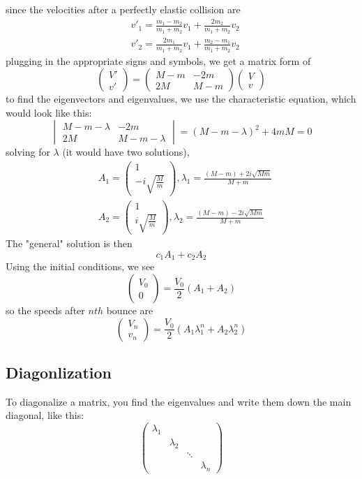 \documentclass[oneside]{book}
\numberwithin{equation}{chapter} %
\begin{document}
since the velocities after a perfectly elastic collision are
\begin{align*}
	&v'_1=\frac{m_1-m_2}{m_1+m_2}v_1+\frac{2m_2}{m_1+m_2}v_2\\
	&v'_2=\frac{2m_1}{m_1+m_2}v_1+\frac{m_2-m_1}{m_1+m_2}v_2
\end{align*}
plugging in the appropriate signs and symbols, we get a matrix form of 
$$
\begin{pmatrix}
	V'\\v'
\end{pmatrix}
=
\begin{pmatrix}
	M-m&-2m\\2M&M-m
\end{pmatrix}
\begin{pmatrix}
	V\\v
\end{pmatrix}
$$
to find the eigenvectors and eigenvalues, we use the characteristic equation, which would look like this:
$$
\begin{vmatrix}
	M-m-\lambda&-2m\\2M&M-m-\lambda
\end{vmatrix}
=(M-m-\lambda)^2+4mM=0
$$
solving for $\lambda$ (it would have two solutions), 
\begin{align*}
	&A_1=\begin{pmatrix}
		1\\-i\sqrt{\frac{M}{m}}
	\end{pmatrix}, \lambda_1=\frac{(M-m)+2i\sqrt{Mm}}{M+m}\\
	&A_2=\begin{pmatrix}
		1\\i\sqrt{\frac{M}{m}}
	\end{pmatrix}, \lambda_2=\frac{(M-m)-2i\sqrt{Mm}}{M+m}
\end{align*}
The "general" solution is then
$$c_1A_1+c_2A_2$$
Using the initial conditions, we see
$$
\begin{pmatrix}
	V_0\\0
\end{pmatrix}=
\frac{V_0}{2}(A_1+A_2)
$$
so the speeds after $nth$ bounce are 
$$
\begin{pmatrix}
	V_n\\v_n
\end{pmatrix}
=\frac{V_0}{2}(A_1\lambda_1^n+A_2\lambda_2^n)
$$
\subsection{Diagonlization}
To diagonalize a matrix, you find the eigenvalues and write them down the main diagonal, like this:
$$
\begin{pmatrix}
	\lambda_1&&&\\&\lambda_2&&\\&&\ddots&\\&&&\lambda_n
\end{pmatrix}
$$
\end{document}
